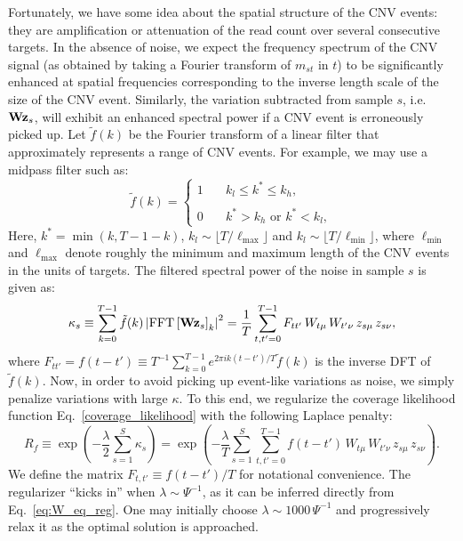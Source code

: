 \documentclass[nofootinbib,amssymb,amsmath]{revtex4}
\newcommand{\vz}{{\bf z}}
\newcommand{\vW}{{\bf W}}
\begin{document}
 Fortunately, we have some idea about the spatial structure of the CNV events: they are amplification or attenuation of the read count over several consecutive targets. In the absence of noise, we expect the frequency spectrum of the CNV signal (as obtained by taking a Fourier transform of $m_{st}$ in $t$) to be significantly enhanced at spatial frequencies corresponding to the inverse length scale of the size of the CNV event. Similarly, the variation subtracted from sample $s$, i.e. $\vW \vz_s$, will exhibit an enhanced spectral power if a CNV event is erroneously picked up. Let $\tilde{f}(k)$ be the Fourier transform of a linear filter that approximately represents a range of CNV events. For example, we may use a midpass filter such as:
\begin{equation}
\tilde{f}(k) = \left\{
\begin{array}{ll}
  1 & \quad k_l \leq k^* \leq k_h,\\
  \\
  0 & \quad k^* > k_h \,\, \text{or} \,\, k^* < k_l,
\end{array}
\right.
\end{equation}
Here, $k^* = \min(k, T - 1 - k)$, $k_l \sim \lfloor T / \ell_\mathrm{max} \rfloor$ and $k_l \sim \lfloor T / \ell_\mathrm{min} \rfloor$, where $\ell_\mathrm{min}$ and $\ell_\mathrm{max}$ denote roughly the minimum and maximum length of the CNV events in the units of targets. The filtered spectral power of the noise in sample $s$ is given as:
\begin{equation}
\kappa_s \equiv \sum_{k=0}^{T-1} \tilde{f}(k) \left|\mathrm{FFT}\left[\vW \vz_s\right]_k\right|^2 = \frac{1}{T}\sum_{t,t'=0}^{T-1}F_{tt'} \, W_{t\mu} \, W_{t'\nu} \, z_{s\mu} \, z_{s\nu},
\end{equation}
where $F_{tt'} = f(t-t') \equiv T^{-1} \sum_{k=0}^{T-1} e^{2\pi i k (t-t')/T} \tilde{f}(k)$ is the inverse DFT of $\tilde{f}(k)$. Now, in order to avoid picking up event-like variations as noise, we simply penalize variations with large $\kappa$. To this end, we regularize the coverage likelihood function Eq.~\eqref{coverage_likelihood} with the following Laplace penalty:
\begin{equation}
R_f \equiv \exp\left(-\frac{\lambda}{2} \sum_{s=1}^S\kappa_s\right) = \exp\left(-\frac{\lambda}{T}\sum_{s=1}^S\sum_{t,t'=0}^{T-1}f(t-t') \, W_{t\mu} \, W_{t'\nu} \, z_{s\mu} \, z_{s\nu}\right).
\end{equation}
We define the matrix $F_{t,t'} \equiv f(t-t')/T$ for notational convenience. The regularizer ``kicks in'' when $\lambda \sim \Psi^{-1}$, as it can be inferred directly from Eq.~\eqref{eq:W_eq_reg}. One may initially choose $\lambda \sim 1000\,\Psi^{-1}$ and progressively relax it as the optimal solution is approached.
\end{document}
